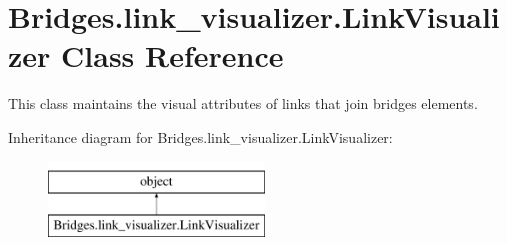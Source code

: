 \hypertarget{class_bridges_1_1link__visualizer_1_1_link_visualizer}{}\section{Bridges.\+link\+\_\+visualizer.\+Link\+Visualizer Class Reference}
\label{class_bridges_1_1link__visualizer_1_1_link_visualizer}


This class maintains the visual attributes of links that join bridges elements.  


Inheritance diagram for Bridges.\+link\+\_\+visualizer.\+Link\+Visualizer\+:\begin{figure}[H]
\begin{center}
\leavevmode
\includegraphics[height=2.000000cm]{class_bridges_1_1link__visualizer_1_1_link_visualizer}
\end{center}
\end{figure}
